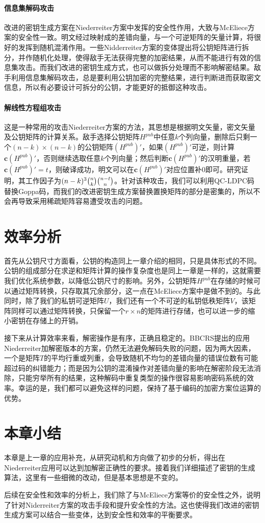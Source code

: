 \paragraph{信息集解码攻击}
改进的密钥生成方案在Niederreiter方案中发挥的安全性作用，大致与McEliece方案的安全性一致。明文经过映射成的差错向量，与一个可逆矩阵的矢量计算，将很好的发挥到随机混淆作用。一些Nidderreiter方案的变体提出将公钥矩阵进行拆分，并作随机化处理，使得敌手无法获得完整的加密结果，从而不能进行有效的信息集攻击。而我们改进的密钥生成方式，也可以做拆分处理而不影响解密结果。敌手利用信息集解码攻击，总是要利用公钥加密的完整结果，进行判断进而获取密文信息，所以有必要设计可拆分的公钥，才能更好的抵御这种攻击。

\paragraph{解线性方程组攻击}
这是一种常用的攻击Niederreiter方案的方法，其思想是根据明文矢量，密文矢量及公钥矩阵的计算关系。敌手选择公钥矩阵$H^{pub}$中任意$k$个列向量，删除后只剩一个$(n - k) \times (n - k)$的公钥矩阵$(H^{pub})'$，如果$(H^{pub})'$可逆，则计算$\mathbf{c}(H^{pub})'$，否则继续选取任意$k$个列向量；然后判断$\mathbf{c}(H^{pub})'$的汉明重量，若$\mathbf{c}(H^{pub})' = t$，则破译成功，明文可以在$\mathbf{c}(H^{pub})'$对应位置补$0$即可。研究证明，其工作因子为$(n - k) ^ 3 \tbinom{n}{k} \tbinom{n - t}{n}$。针对该种攻击，我们可以利用QC-LDPC码替换Goppa码，而我们的改进密钥生成方案替换置换矩阵的部分是密集的，所以不会再导致采用稀疏矩阵容易遭受攻击的问题。

\section{效率分析}
首先从公钥尺寸方面看，公钥的构造同上一章介绍的相同，只是具体形式的不同。公钥的组成部分在求逆和矩阵计算的操作复杂度也是同上一章是一样的，这就需要我们优化系统参数，以降低公钥尺寸的影响。另外，公钥矩阵$H^{pub}$在存储的时候可以通过矩阵转换，只存取其冗余部分，这一点在McEliece方案中是做不到的。与此同时，除了我们的私钥可逆矩阵$U$，我们还有一个不可逆的私钥低秩矩阵$V$，该矩阵同样可以通过矩阵转换，只保留一个$r \times n$的矩阵进行存储，也可以进一步的缩小密钥在存储上的开销。

接下来从计算效率来看，解密操作是有序，正确且稳定的。BBCRS提出的应用Niederreiter加解密版本的方案，仍然无法避免解码失败的问题，因为两大因素，一个是矩阵$T$的平均行重或列重，会导致随机不均匀的差错向量的错误位数有可能超过码的纠错能力；而是因为公钥的混淆操作对差错向量的影响在解密阶段无法消除，只能穷举所有的结果，这种解码中重复类型的操作很容易影响密码系统的效率。幸运的是，我们都可以避免这样的问题，保持了基于编码的加密方案位运算的优势。

\section{本章小结}
本章是上一章的应用补充，从研究动机和方向做了初步的分析，得出在Niederreiter应用可以达到加解密正确性的要求。接着我们详细描述了密钥的生成算法，这里有一些细微的改动，但是基本思想是不变的。

后续在安全性和效率的分析上，我们除了与McEliece方案等价的安全性之外，说明了针对Niderreiter方案的攻击手段和提升安全性的方法。这也使得我们改进的密钥生成方案可以结合一些变体，达到安全性和效率的平衡要求。

